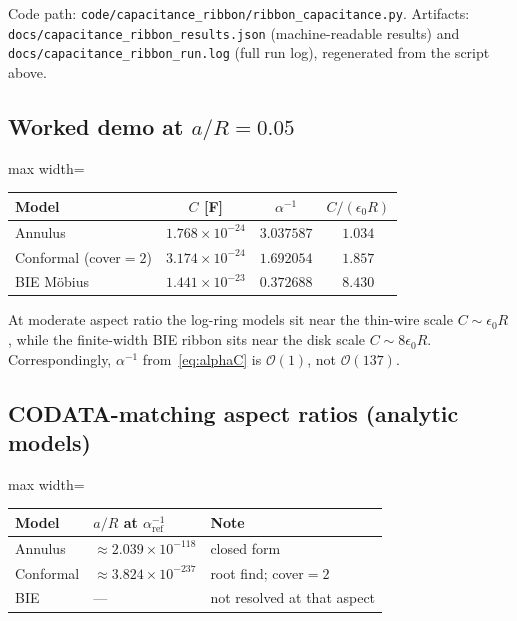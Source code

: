 \documentclass[11pt,a4paper]{article}
\begin{document}
Code path:
\nolinkurl{code/capacitance_ribbon/ribbon_capacitance.py}.
Artifacts:
\nolinkurl{docs/capacitance_ribbon_results.json} (machine-readable results)
and \nolinkurl{docs/capacitance_ribbon_run.log} (full run log), regenerated
from the script above.

\subsection{Worked demo at $a/R=0.05$}

\begin{center}
\begin{adjustbox}{max width=\linewidth}\begin{tabular}{@{}lccc@{}}
\toprule
Model & $C$ [F] & $\alpha^{-1}$ & $C/(\epsilon_0 R)$ \\
\midrule
Annulus & $1.768\times 10^{-24}$ & $3.037587$ & $1.034$ \\
Conformal (cover$=2$) & $3.174\times 10^{-24}$ & $1.692054$ & $1.857$ \\
BIE M\"obius & $1.441\times 10^{-23}$ & $0.372688$ & $8.430$ \\
\bottomrule
\end{tabular}\end{adjustbox}
\end{center}

At moderate aspect ratio the log-ring models sit near the thin-wire
scale $C\sim\epsilon_0 R$, while the finite-width BIE ribbon sits near
the disk scale $C\sim 8\epsilon_0 R$.  Correspondingly,
$\alpha^{-1}$ from~\eqref{eq:alphaC} is $\mathcal{O}(1)$, not
$\mathcal{O}(137)$.

\subsection{CODATA-matching aspect ratios (analytic models)}

\begin{center}
\begin{adjustbox}{max width=\linewidth}\begin{tabular}{@{}lll@{}}
\toprule
Model & $a/R$ at $\alpha^{-1}_{\mathrm{ref}}$ & Note \\
\midrule
Annulus & $\approx 2.039\times 10^{-118}$ & closed form \\
Conformal & $\approx 3.824\times 10^{-237}$ & root find; cover$=2$ \\
BIE & --- & not resolved at that aspect \\
\bottomrule
\end{tabular}\end{adjustbox}
\end{center}
\end{document}
